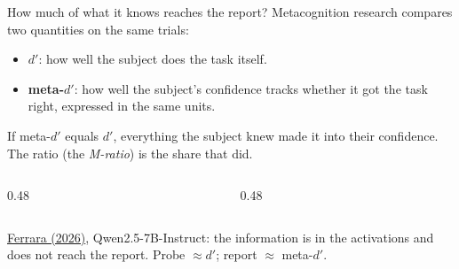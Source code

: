 \documentclass[aspectratio=169,11pt]{beamer}
\begin{document}
\begin{frame}[label=metad]{How much of what it knows reaches the report?}
Metacognition research compares two quantities on the same trials:
\begin{itemize}\setlength\itemsep{4pt}
  \item {\small $d'$: how well the subject does the task itself.}
  \item {\small \textbf{meta-$d'$}: how well the subject's confidence tracks whether it got the task right, expressed in the same units.}
\end{itemize}

\vspace{0.3em}
{\small If meta-$d'$ equals $d'$, everything the subject knew made it into their confidence. The ratio (the \emph{M-ratio}) is the share that did.}

\vspace{0.2em}
\begin{columns}[T]
\begin{column}{0.48\textwidth}
\begin{center}
\end{center}
\end{column}
\begin{column}{0.48\textwidth}
\begin{center}
\end{center}
\end{column}
\end{columns}

\vspace{0.4em}
{\footnotesize \href{https://arxiv.org/abs/2608.20569}{Ferrara (2026)}, Qwen2.5-7B-Instruct: the information is in the activations and does not reach the report. Probe $\approx d'$; report $\approx$ meta-$d'$.}
\end{frame}
\end{document}
